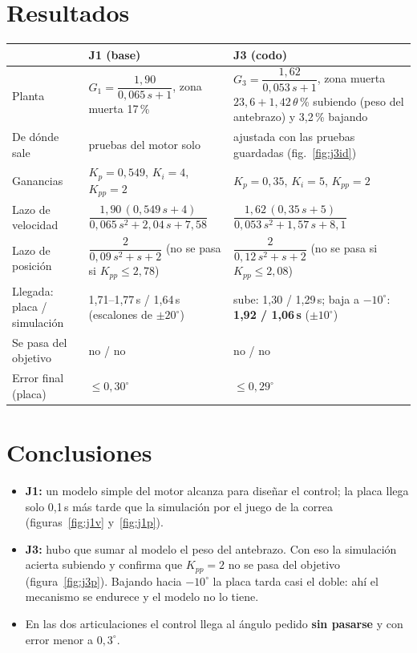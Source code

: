 \documentclass[10pt,a4paper]{article}
\begin{document}
\section{Resultados}
{\small
\begin{tabular}{@{}p{3.6cm}p{6.3cm}p{6.6cm}@{}}
  \toprule
  & \textbf{J1 (base)} & \textbf{J3 (codo)} \\
  \midrule
  Planta & $G_1=\dfrac{1{,}90}{0{,}065\,s+1}$, zona muerta 17\,\% & $G_3=\dfrac{1{,}62}{0{,}053\,s+1}$, zona muerta
  $23{,}6+1{,}42\,\theta$\,\% subiendo (peso del antebrazo) y 3,2\,\% bajando \\[8pt]
  De dónde sale & pruebas del motor solo & ajustada con las pruebas guardadas (fig.~\ref{fig:j3id}) \\
  Ganancias & $K_p=0{,}549$, $K_i=4$, $K_{pp}=2$ & $K_p=0{,}35$, $K_i=5$, $K_{pp}=2$ \\[3pt]
  Lazo de velocidad & $\dfrac{1{,}90\,(0{,}549\,s+4)}{0{,}065\,s^2+2{,}04\,s+7{,}58}$ &
  $\dfrac{1{,}62\,(0{,}35\,s+5)}{0{,}053\,s^2+1{,}57\,s+8{,}1}$ \\[10pt]
  Lazo de posición & $\dfrac{2}{0{,}09\,s^2+s+2}$ (no se pasa si $K_{pp}\le 2{,}78$) &
  $\dfrac{2}{0{,}12\,s^2+s+2}$ (no se pasa si $K_{pp}\le 2{,}08$) \\[10pt]
  Llegada: placa / simulación & 1,71--1,77\,s / 1,64\,s (escalones de $\pm20^\circ$) &
  sube: 1,30 / 1,29\,s; baja a $-10^\circ$: \textbf{1,92 / 1,06\,s} ($\pm10^\circ$) \\
  Se pasa del objetivo & no / no & no / no \\
  Error final (placa) & $\le 0{,}30^\circ$ & $\le 0{,}29^\circ$ \\
  \bottomrule
\end{tabular}
}

\section{Conclusiones}
\begin{itemize}\setlength{\itemsep}{1pt}
  \item \textbf{J1:} un modelo simple del motor alcanza para diseñar el control; la placa llega solo 0,1\,s más tarde que
        la simulación por el juego de la correa (figuras~\ref{fig:j1v} y~\ref{fig:j1p}).
  \item \textbf{J3:} hubo que sumar al modelo el peso del antebrazo. Con eso la simulación acierta subiendo y confirma
        que $K_{pp}=2$ no se pasa del objetivo (figura~\ref{fig:j3p}). Bajando hacia $-10^\circ$ la placa tarda casi el
        doble: ahí el mecanismo se endurece y el modelo no lo tiene.
  \item En las dos articulaciones el control llega al ángulo pedido \textbf{sin pasarse} y con error menor a $0{,}3^\circ$.
\end{itemize}
\end{document}
